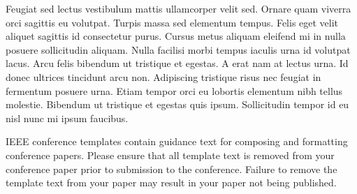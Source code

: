 \documentclass[conference]{IEEEtran}
\begin{document}
Feugiat sed lectus vestibulum mattis ullamcorper velit sed. Ornare quam viverra orci sagittis eu volutpat. Turpis massa sed elementum tempus. Felis eget velit aliquet sagittis id consectetur purus. Cursus metus aliquam eleifend mi in nulla posuere sollicitudin aliquam. Nulla facilisi morbi tempus iaculis urna id volutpat lacus. Arcu felis bibendum ut tristique et egestas. A erat nam at lectus urna. Id donec ultrices tincidunt arcu non. Adipiscing tristique risus nec feugiat in fermentum posuere urna. Etiam tempor orci eu lobortis elementum nibh tellus molestie. Bibendum ut tristique et egestas quis ipsum. Sollicitudin tempor id eu nisl nunc mi ipsum faucibus.



\vspace{12pt}
\color{red}
IEEE conference templates contain guidance text for composing and formatting conference papers. Please ensure that all template text is removed from your conference paper prior to submission to the conference. Failure to remove the template text from your paper may result in your paper not being published.
\end{document}
